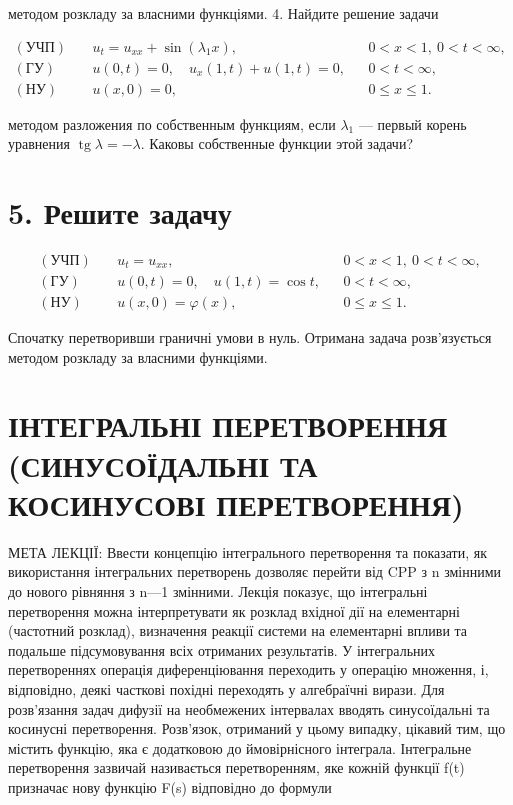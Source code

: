 \documentclass[
  ukrainian,
]{article}
\begin{document}
методом розкладу за власними функціями. 4. Найдите решение задачи

\[
\begin{aligned}
(\text{УЧП})\quad & u_t = u_{xx} + \sin(\lambda_1 x), && 0 < x < 1,\ 0 < t < \infty, \\
(\text{ГУ})\quad & u(0,t) = 0,\quad u_x(1,t) + u(1,t) = 0, && 0 < t < \infty, \\
(\text{НУ})\quad & u(x,0) = 0, && 0 \leqslant x \leqslant 1.
\end{aligned}
\]

методом разложения по собственным функциям, если \(\lambda_1\) ---
первый корень уравнения \(\operatorname{tg}\lambda = -\lambda\). Каковы
собственные функции этой задачи?

\section{5. Решите
задачу}\label{ux440ux435ux448ux438ux442ux435-ux437ux430ux434ux430ux447ux443}

\[
\begin{aligned}
(\text{УЧП})\quad & u_t = u_{xx}, && 0 < x < 1,\ 0 < t < \infty, \\
(\text{ГУ})\quad & u(0,t) = 0,\quad u(1,t) = \cos t, && 0 < t < \infty, \\
(\text{НУ})\quad & u(x,0) = \varphi(x), && 0 \leqslant x \leqslant 1.
\end{aligned}
\]

Спочатку перетворивши граничні умови в нуль. Отримана задача
розв'язується методом розкладу за власними функціями.

\section{ІНТЕГРАЛЬНІ ПЕРЕТВОРЕННЯ (СИНУСОЇДАЛЬНІ ТА КОСИНУСОВІ
ПЕРЕТВОРЕННЯ)}\label{ux456ux43dux442ux435ux433ux440ux430ux43bux44cux43dux456-ux43fux435ux440ux435ux442ux432ux43eux440ux435ux43dux43dux44f-ux441ux438ux43dux443ux441ux43eux457ux434ux430ux43bux44cux43dux456-ux442ux430-ux43aux43eux441ux438ux43dux443ux441ux43eux432ux456-ux43fux435ux440ux435ux442ux432ux43eux440ux435ux43dux43dux44f}

МЕТА ЛЕКЦІЇ: Ввести концепцію інтегрального перетворення та показати, як
використання інтегральних перетворень дозволяє перейти від CPP з n
змінними до нового рівняння з n---1 змінними. Лекція показує, що
інтегральні перетворення можна інтерпретувати як розклад вхідної дії на
елементарні (частотний розклад), визначення реакції системи на
елементарні впливи та подальше підсумовування всіх отриманих
результатів. У інтегральних перетвореннях операція диференціювання
переходить у операцію множення, і, відповідно, деякі часткові похідні
переходять у алгебраїчні вирази. Для розв'язання задач дифузії на
необмежених інтервалах вводять синусоїдальні та косинусні перетворення.
Розв'язок, отриманий у цьому випадку, цікавий тим, що містить функцію,
яка є додатковою до ймовірнісного інтеграла. Інтегральне перетворення
зазвичай називається перетворенням, яке кожній функції f(t) призначає
нову функцію F(s) відповідно до формули
\end{document}
